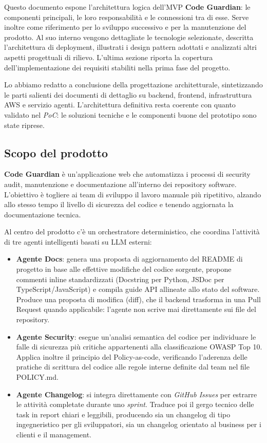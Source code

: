 \documentclass[12pt, a4paper]{article}
\begin{document}
Questo documento espone l'architettura logica dell'MVP \textbf{Code Guardian}: le componenti principali, le loro responsabilità e le connessioni tra di esse. Serve inoltre come riferimento per lo sviluppo successivo e per la manutenzione del prodotto. Al suo interno vengono dettagliate le tecnologie selezionate, descritta l'architettura di deployment, illustrati i design pattern adottati e analizzati altri aspetti progettuali di rilievo. L'ultima sezione riporta la copertura dell'implementazione dei requisiti stabiliti nella prima fase del progetto.
 
Lo abbiamo redatto a conclusione della progettazione architetturale, sintetizzando le parti salienti dei documenti di dettaglio su backend, frontend, infrastruttura AWS e servizio agenti. L'architettura definitiva resta coerente con quanto validato nel \textit{PoC}: le soluzioni tecniche e le componenti buone del prototipo sono state riprese.

\subsection{Scopo del prodotto}

\textbf{Code Guardian} è un'applicazione web che automatizza i processi di security audit, manutenzione e documentazione all'interno dei repository software. L'obiettivo è togliere ai team di sviluppo il lavoro manuale più ripetitivo, alzando allo stesso tempo il livello di sicurezza del codice e tenendo aggiornata la documentazione tecnica.

Al centro del prodotto c'è un orchestratore deterministico, che coordina l'attività di tre agenti intelligenti basati su LLM esterni:
\begin{itemize}
    \item \textbf{Agente Docs}: genera una proposta di aggiornamento del README di progetto in base alle effettive modifiche del codice sorgente, propone commenti inline standardizzati (Docstring per Python, JSDoc per TypeScript/JavaScript) e compila guide API allineate allo stato del software. Produce una proposta di modifica (diff), che il backend trasforma in una Pull Request quando applicabile: l'agente non scrive mai direttamente sui file del repository.
    \item \textbf{Agente Security}: esegue un'analisi semantica del codice per individuare le falle di sicurezza più critiche appartenenti alla classificazione OWASP Top 10. Applica inoltre il principio del Policy-as-code, verificando l'aderenza delle pratiche di scrittura del codice alle regole interne definite dal team nel file POLICY.md.
    \item \textbf{Agente Changelog}: si integra direttamente con \textit{GitHub Issues} per estrarre le attività completate durante uno \textit{sprint}. Traduce poi il gergo tecnico delle task in report chiari e leggibili, producendo sia un changelog di tipo ingegneristico per gli sviluppatori, sia un changelog orientato al business per i clienti e il management.
\end{itemize}
\end{document}

